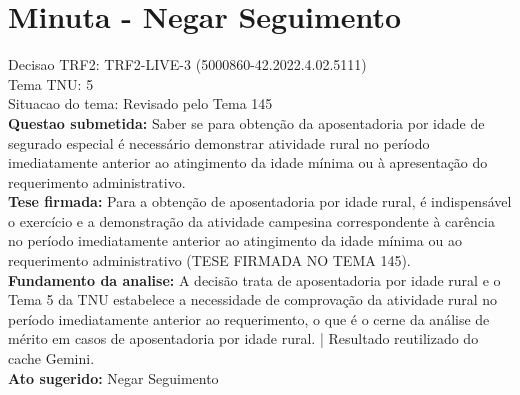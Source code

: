 \documentclass{article}
\begin{document}
\section*{Minuta - Negar Seguimento}
Decisao TRF2: TRF2-LIVE-3 (5000860-42.2022.4.02.5111)\\
Tema TNU: 5\\
Situacao do tema: Revisado pelo Tema 145\\
\textbf{Questao submetida:} Saber se para obtenção da aposentadoria por idade de segurado especial é necessário demonstrar atividade rural no período imediatamente anterior ao atingimento da idade mínima ou à apresentação do requerimento administrativo.\\
\textbf{Tese firmada:} Para a obtenção de aposentadoria por idade rural, é indispensável o exercício e a demonstração da atividade campesina correspondente à carência no período imediatamente anterior ao atingimento da idade mínima ou ao requerimento administrativo (TESE FIRMADA NO TEMA 145).\\
\textbf{Fundamento da analise:} A decisão trata de aposentadoria por idade rural e o Tema 5 da TNU estabelece a necessidade de comprovação da atividade rural no período imediatamente anterior ao requerimento, o que é o cerne da análise de mérito em casos de aposentadoria por idade rural. | Resultado reutilizado do cache Gemini.\\
\textbf{Ato sugerido:} Negar Seguimento
\end{document}
